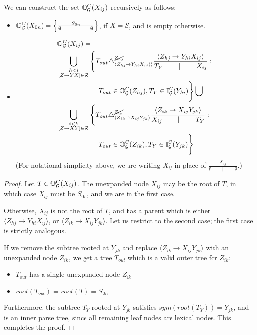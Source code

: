 \documentclass{article}
\newcommand\Inner{\mathbb{I}}
\newcommand\Outer{\mathbb{O}}
\begin{document}
\begin{prop}
  We can construct the set $\Outer_\GGG^C(X_{ij})$ recursively as
  follows:
\begin{itemize}
\item $\Outer_\GGG^C(X_{0n}) = \left\{ \frac{S_{0n}}{\emptyset \qquad
      \mid \qquad \emptyset} \right\}$, if $X=S$, and is empty otherwise.
\item 
\begin{align*}
&\Outer_\GGG^C(X_{ij}) = \\
&\bigcup_{\substack{h < i \\ [Z \to YX]\in \RRR}}
\Bigg\{
T_{out} \triangle^{\cancel{Z_{hj}}}_{\langle Z_{hj} \to Y_{hi}
  X_{ij})\rangle} \frac{ \langle Z_{hj} \to Y_{hi}
  X_{ij} \rangle}{ T_Y \qquad \mid \qquad X_{ij}} : \\
&\qquad\qquad\qquad T_{out} \in \Outer_\GGG^C(Z_{hj}), T_Y \in \Inner_\GGG^C(Y_{hi}) 
\Bigg\} \bigcup\\
&\bigcup_{\substack{i < k \\ [Z \to
    XY]\in \RRR}}
\Bigg\{
T_{out} \triangle^{\cancel{Z_{ik}}}_{\langle Z_{ik} \to X_{ij} Y_{jk}
  \rangle} \frac{ \langle Z_{ik} \to X_{ij}
  Y_{jk} \rangle}{ X_{ij} \qquad \mid \qquad  T_Y } :\\
&\qquad\qquad\qquad T_{out} \in \Outer_\GGG^C(Z_{ik}),
 T_Y \in \Inner_\GGG^C(Y_{jk}) \Bigg\}\\
\end{align*}
(For notational simplicity above, we are writing $X_{ij}$ in
place of $\frac{X_{ij}}{\emptyset \qquad \mid \qquad
  \emptyset}$.)
\end{itemize}
\end{prop}
\begin{proof}
  Let $T\in \Outer_\GGG^C(X_{ij})$. The unexpanded
  node $X_{ij}$ may be the root of $T$, in which case $X_{ij}$ must be
  $S_{0n}$, and we are in the first case.

  Otherwise, $X_{ij}$ is not the root of $T$, and has a parent which
  is either $\langle Z_{hj} \to Y_{hi} X_{ij} \rangle$, or $\langle
  Z_{ik} \to X_{ij} Y_{jk} \rangle$. Let us restrict to the second
  case; the first case is strictly analogous. 
  
  If we remove the subtree rooted at $Y_{jk}$ and replace $\langle
  Z_{ik} \to X_{ij} Y_{jk} \rangle$ with an unexpanded node $Z_{ik}$, we get a
  tree $T_{out}$ which is a valid outer tree for $Z_{ik}$:
  \begin{itemize}
  \item $T_{out}$ has a single unexpanded node $Z_{ik}$
  \item $root(T_{out}) = root(T) = S_{0n}$.
  \end{itemize}
  Furthermore, the subtree $T_Y$ rooted at $Y_{jk}$ satisfies
  $sym(root(T_Y)) = Y_{jk}$, and is an inner parse tree, since all
  remaining leaf nodes are lexical nodes. This completes the proof.
  
\end{proof}
\end{document}
